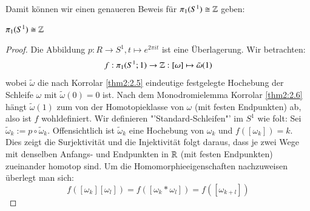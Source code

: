\documentclass[a4paper,10pt]{scrartcl}
\newcommand{\homo}{\cong}
\begin{document}
Damit können wir einen genaueren Beweis für $\pi_1(S^1)\homo \Z$ geben:
\begin{st}
 $\pi_1(S^1)\homo \Z$
\end{st}
\begin{proof}
 Die Abbildung $p:R\to S^1, t\mapsto e^{2\pi i t}$ ist eine Überlagerung. Wir betrachten:
\[
 f:\pi_1(S^1; 1)\to \mathbb{Z}: [\omega] \mapsto \tilde \omega (1)
\]
\fixme[fig74]
wobei $\tilde \omega$ die nach Korrolar \ref{thm2:2.5} eindeutige festgelegte Hochebung der Schleife $\omega$ mit $\tilde \omega(0)=0$ ist. Nach dem Monodromielemma Korrolar \ref{thm2:2.6} hängt $\tilde \omega(1)$ zum von der Homotopieklasse von $\omega$ (mit festen Endpunkten) ab, also ist $f$ wohldefiniert.
Wir definieren "'Standard-Schleifen"' im $S^1$ wie folt: Sei $\tilde \omega_k:=p\circ \tilde \omega_k$. Offensichtlich ist $\tilde \omega_k$ eine Hochebung von $\omega_k$ und $f([\omega_k])=k$. Dies zeigt die Surjektivität und die Injektivität folgt daraus, dass je zwei Wege mit denselben Anfangs- und Endpunkten in $\mathbb{R}$ (mit festen Endpunkten) zueinander homotop sind. Um die Homomorphieeigenschaften nachzuweisen überlegt man sich:
\[
 f([\omega_k][\omega_l])=f([\omega_k * \omega_l])=f([\omega_{k+l}])
\]
\end{proof}
\end{document}
